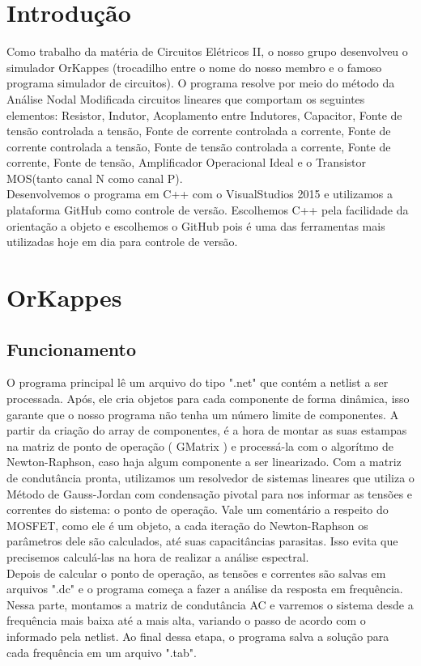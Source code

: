 \documentclass[a4paper,12pt]{article} %
\begin{document}
\section{Introdução}
Como trabalho da matéria de Circuitos Elétricos II, o nosso grupo desenvolveu o simulador OrKappes (trocadilho entre o nome do nosso membro e o famoso programa simulador de circuitos). O programa resolve por meio do método da Análise Nodal Modificada circuitos lineares que comportam os seguintes elementos: Resistor, Indutor, Acoplamento entre Indutores, Capacitor, Fonte de tensão controlada a tensão, Fonte de corrente controlada a corrente, Fonte de corrente controlada a tensão, Fonte de tensão controlada a corrente, Fonte de corrente, Fonte de tensão, Amplificador Operacional Ideal e o Transistor MOS(tanto canal N como canal P).\\ 
Desenvolvemos o programa em C++ com o VisualStudios 2015 e utilizamos a plataforma GitHub como controle de versão. Escolhemos C++ pela facilidade da orientação a objeto e escolhemos o GitHub pois é uma das ferramentas mais utilizadas hoje em dia para controle de versão.

\section{OrKappes}
\subsection{Funcionamento} %
 O programa principal lê um arquivo do tipo ".net" que contém a netlist a ser processada. Após, ele cria objetos para cada componente de forma dinâmica, isso garante que o nosso programa não tenha um número limite de componentes. A partir da criação do array de componentes, é a hora de montar as suas estampas na matriz de ponto de operação ( GMatrix ) e processá-la com o algorítmo de Newton-Raphson, caso haja algum componente a ser linearizado. Com a matriz de condutância pronta, utilizamos um resolvedor de sistemas lineares que utiliza o Método de Gauss-Jordan com condensação pivotal para nos informar as tensões e correntes do sistema: o ponto de operação. Vale um comentário a respeito do MOSFET, como ele é um objeto, a cada iteração do Newton-Raphson os parâmetros dele são calculados, até suas capacitâncias parasitas. Isso evita que precisemos calculá-las na hora de realizar a análise espectral.\\ 
 Depois de calcular o ponto de operação, as tensões e correntes são salvas em arquivos ".dc" e o programa começa a fazer a análise da resposta em frequência. Nessa parte, montamos a matriz de condutância AC e varremos o sistema desde a frequência mais baixa até a mais alta, variando o passo de acordo com o informado pela netlist. Ao final dessa etapa, o programa salva a solução para cada frequência em um arquivo ".tab".
\end{document}
